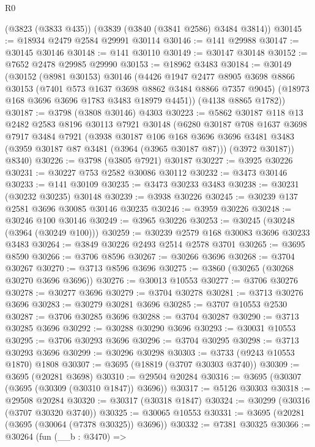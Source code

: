 \begin{lexlean}{R0}
\begin{coremodule}
    (@3823 (@3833 @435))
    (@3839 (@3840 (@3841 @2586) @3484 @3814))
@30145 := @18934 @2479 @2584 @29991 @30114
@30146 := @141 @29988
@30147 := @30145 @30146
@30148 := @141 @30110
@30149 := @30147 @30148
@30152 := @7652 @2478 @29985 @29990
@30153 := @18962 @3483
@30184 := @30149
    (@30152
      (@8981 @30153)
      @30146
      (@4426
        @1947
        @2477
        @8905
        @3698
        @8866
        @30153
        (@7401 @573 @1637 @3698 @8862 @3484 @8866 @7357 @9045)
        (@18973 @168 @3696 @3696 @1783 @3483 @18979 @4451))
      (@4138 @8865 @1782))
@30187 := @3798 (@3808 @30146) @4303
@30223 := @5862
    @30187
    @118
    @13
    @2482
    @2583
    @8196
    @30113
    @7921
    @30148
    (@6280
      @30187
      @708
      @1637
      @3698
      @7917
      @3484
      @7921
      (@3938
        @30187
        @106
        @168
        @3696
        @3696
        @3481
        @3483
        (@3959 @30187 @87 @3481 (@3964 (@3965 @30187 @87)))
        (@3972 @30187))
      @8340)
@30226 := @3798 (@3805 @7921) @30187
@30227 := @3925 @30226
@30231 := @30227 @753 @2582 @30086 @30112
@30232 := @3473 @30146
@30233 := @141 @30109
@30235 := @3473 @30233 @3483
@30238 := @30231 (@30232 @30235) @30148
@30239 := @3938 @30226
@30245 := @30239 @137 @2581 @3696 @30085 @30146 @30235
@30246 := @3959 @30226
@30248 := @30246 @100 @30146
@30249 := @3965 @30226
@30253 := @30245 (@30248 (@3964 (@30249 @100)))
@30259 := @30239 @2579 @168 @30083 @3696 @30233 @3483
@30264 := @3849 @30226 @2493 @2514 @2578 @3701
@30265 := @3695 @8590
@30266 := @3706 @8596
@30267 := @30266 @3696
@30268 := @3704 @30267
@30270 := @3713 @8596 @3696
@30275 := @3860 (@30265 (@30268 @30270 @3696 @3696))
@30276 := @30013 @10553
@30277 := @3706 @30276
@30278 := @30277 @3696
@30279 := @3704 @30278
@30281 := @3713 @30276 @3696
@30283 := @30279 @30281 @3696
@30285 := @3707 @10553 @2530
@30287 := @3706 @30285 @3696
@30288 := @3704 @30287
@30290 := @3713 @30285 @3696
@30292 := @30288 @30290 @3696
@30293 := @30031 @10553
@30295 := @3706 @30293 @3696
@30296 := @3704 @30295
@30298 := @3713 @30293 @3696
@30299 := @30296 @30298
@30303 := @3733 (@9243 @10553 @1870) @1808
@30307 := @3695 (@18819 (@3707 @30303 @3740))
@30309 := @3695 (@20281 @3698)
@30310 := @29504 @20284
@30316 := @3695 (@30307 (@3695 (@30309 (@30310 @1847)) @3696))
@30317 := @5126 @30303
@30318 := @29508 @20284
@30320 := @30317 (@30318 @1847)
@30324 := @30299 (@30316 (@3707 @30320 @3740))
@30325 := @30065 @10553
@30331 := @3695 (@20281 (@3695 (@30064 (@7378 @30325)) @3696))
@30332 := @7381 @30325
@30366 := @30264
    (fun (__b : @3470) =>

\end{coremodule}
\end{lexlean}
